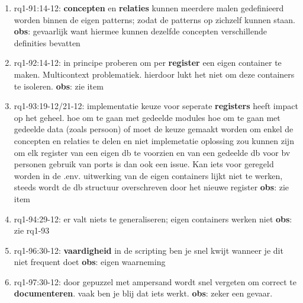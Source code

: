 \begin{enumerate}
    \item rq1-91:14-12: \textbf{concepten} en \textbf{relaties} kunnen meerdere malen gedefinieerd worden binnen de eigen patterns; zodat de patterns op zichzelf kunnen staan.
    \newline\textbf{obs}: gevaarlijk want hiermee kunnen dezelfde concepten verschillende definities bevatten
    
    \item rq1-92:14-12: in principe proberen om per \textbf{register} een eigen container te maken. Multicontext problematiek. 
    hierdoor lukt het niet om deze containers te isoleren. 
    \newline\textbf{obs}: zie item
    
    \item rq1-93:19-12/21-12: implementatie keuze voor seperate \textbf{registers} heeft impact op het geheel.
    hoe om te gaan met gedeelde modules
    hoe om te gaan met gedeelde data (zoals persoon)
    of moet de keuze gemaakt worden om enkel de concepten en relaties te delen en niet implemetatie
    oplossing zou kunnen zijn om elk register van een eigen db te voorzien en van een gedeelde db voor bv personen
    gebruik van ports is dan ook een issue. Kan iets voor geregeld worden in de .env.
    uitwerking van de eigen containers lijkt niet te werken, steeds wordt de db structuur overschreven door het nieuwe register
    \newline\textbf{obs}: zie item
    
    \item rq1-94:29-12: er valt niets te generaliseren; eigen containers werken niet
    \newline\textbf{obs}:  zie rq1-93
    
    \item rq1-96:30-12: \textbf{vaardigheid} in de scripting ben je snel kwijt wanneer je dit niet frequent doet
    \newline\textbf{obs}: eigen waarneming
    
    \item rq1-97:30-12: door gepuzzel met ampersand wordt snel vergeten om correct te \textbf{documenteren}. vaak ben je blij dat iets werkt.
    \newline\textbf{obs}: zeker een gevaar.
    
\end{enumerate}



